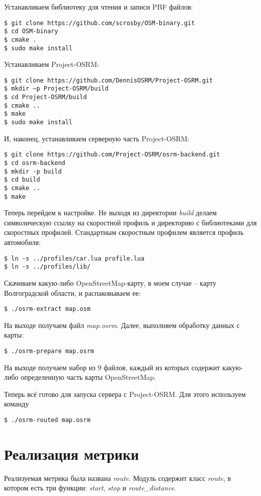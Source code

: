 Устанавливаем библиотеку для чтения и записи PBF файлов:
\begin{lstlisting}
$ git clone https://github.com/scrosby/OSM-binary.git
$ cd OSM-binary
$ cmake .
$ sudo make install
\end{lstlisting}

Устанавливаем Project-OSRM:
\begin{lstlisting}
$ git clone https://github.com/DennisOSRM/Project-OSRM.git
$ mkdir –p Project-OSRM/build
$ cd Project-OSRM/build
$ cmake ..
$ make
$ sudo make install
\end{lstlisting}

И, наконец, устанавливаем серверную часть Project-OSRM:
\begin{lstlisting}
$ git clone https://github.com/Project-OSRM/osrm-backend.git
$ cd osrm-backend
$ mkdir -p build
$ cd build
$ cmake ..
$ make
\end{lstlisting}

Теперь перейдем к настройке. Не выходя из директории \emph{build} делаем символическую ссылку
на скоростной профиль и директорию с библиотеками для скоростных профилей. Стандартным скоростным
профилем является профиль автомобиля:
\begin{lstlisting}
$ ln -s ../profiles/car.lua profile.lua
$ ln -s ../profiles/lib/
\end{lstlisting}

Скачиваем какую-либо OpenStreetMap-карту, в моем случае -- карту Вол\-го\-град\-ской области, и
распаковываем ее:
\begin{lstlisting}
$ ./osrm-extract map.osm
\end{lstlisting}

На выходе получаем файл \emph{map.osrm}. Далее, выполняем обработку данных с карты:
\begin{lstlisting}
$ ./osrm-prepare map.osrm
\end{lstlisting}
На выходе получаем набор из 9 файлов, каждый из которых содержит какую-либо определенную часть
карты OpenStreetMap.

Теперь всё готово для запуска сервера с Project-OSRM. Для этого ис\-поль\-зуем команду
\begin{lstlisting}
$ ./osrm-routed map.osrm
\end{lstlisting}

\section{Реализация метрики}
Реализуемая метрика была названа \emph{route}. Модуль содержит класс \emph{route},
в котором есть три функции: \emph{start}, \emph{stop} и \emph{route\_distance}.

